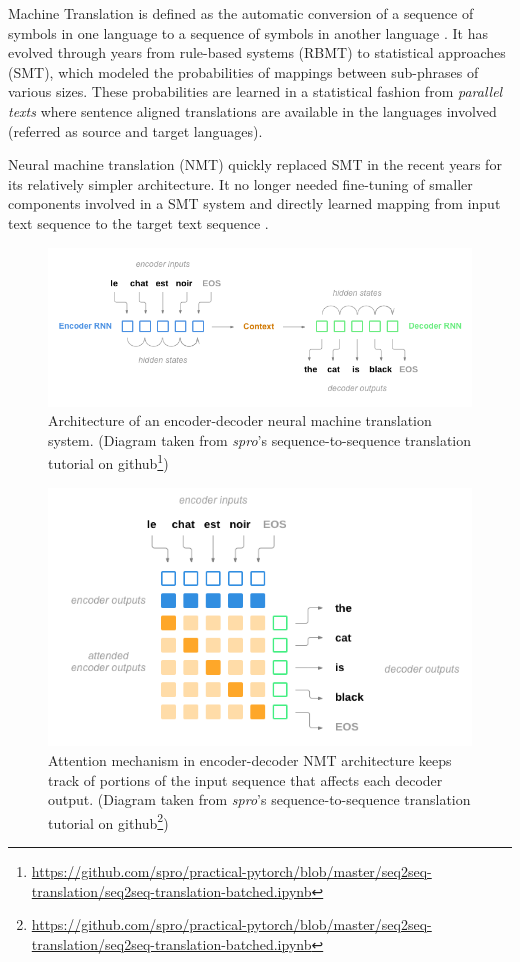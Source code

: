Machine Translation is defined as the automatic conversion of a sequence of symbols in one language to a sequence of symbols in another language \citep{bengio_dl}. It has evolved through years from rule-based systems (RBMT) to statistical approaches (SMT), which modeled the probabilities of mappings between sub-phrases of various sizes. These probabilities are learned in a statistical fashion from \textit{parallel texts} where sentence aligned translations are available in the languages involved (referred as source and target languages). 

Neural machine translation (NMT) quickly replaced SMT in the recent years for its relatively simpler architecture. It no longer needed fine-tuning of smaller components involved in a SMT system and directly learned mapping from input text sequence to the target text sequence \citep{bahdanau, google_nmt}.


\begin{figure}[t]
  \centering
  \includegraphics[width=\linewidth]{img/spro_nmt.png}
  \caption{Architecture of an encoder-decoder neural machine translation system. (Diagram taken from \textit{spro}'s sequence-to-sequence translation tutorial on github\footnote{\url{https://github.com/spro/practical-pytorch/blob/master/seq2seq-translation/seq2seq-translation-batched.ipynb}})}
  \label{sota:nmt_schema}
\end{figure}

\begin{figure}[t]
  \centering
  \includegraphics[width=0.8\linewidth]{img/spro_nmt_attention.png}
  \caption{Attention mechanism in encoder-decoder NMT architecture keeps track of portions of the input sequence that affects each decoder output. (Diagram taken from \textit{spro}'s sequence-to-sequence translation tutorial on github\footnote{\url{https://github.com/spro/practical-pytorch/blob/master/seq2seq-translation/seq2seq-translation-batched.ipynb}})}
  \label{sota:nmt_attention}
\end{figure}

